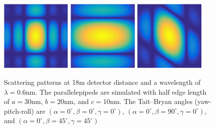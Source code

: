 \begin{figure}[htb]
\includegraphics[width=0.31\textwidth]{../images/form_factor/supershapes/parallelepiped_0_0_0_18m.png}
\includegraphics[width=0.31\textwidth]{../images/form_factor/supershapes/parallelepiped_0_90_0_18m.png}   \includegraphics[width=0.31\textwidth]{../images/form_factor/supershapes/parallelepiped_0_45_45_18m.png}
\caption{Scattering patterns at 18m detector distance and a wavelength of $\lambda=0.6$nm. The parallelepipeds are simulated with half edge length of $a=30$nm, $b=20$nm, and $c=10$nm. The Tait–Bryan angles (yaw-pitch-roll) are $(\alpha=0^\circ,\beta=0^\circ,\gamma=0^\circ)$, $(\alpha=0^\circ,\beta=90^\circ,\gamma=0^\circ)$, and $(\alpha=0^\circ,\beta=45^\circ,\gamma=45^\circ)$ }
\label{fig:opo_parallelepipedIQ2D}
\end{figure}

